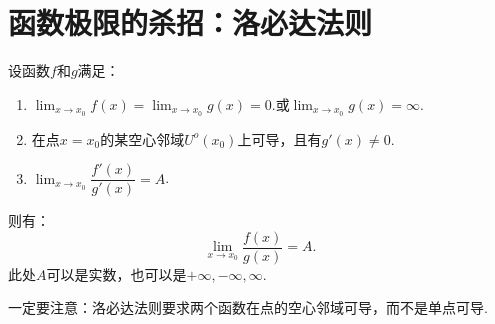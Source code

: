 \section{函数极限的杀招：洛必达法则}

\begin{theorem}[洛必达法则]
	设函数$f$和$g$满足：
	\begin{enumerate}
		\item $\displaystyle\lim_{x\to x_0}f(x)=\displaystyle\lim_{x\to x_0}g(x)=0.$或$\displaystyle\lim_{x\to x_0}g(x)=\infty$.
		\item 在点$x=x_0$的某空心邻域$U^o(x_0)$上可导，且有$g'(x)\neq 0$.
		\item $\displaystyle\lim_{x\to x_0}\dfrac{f'(x)}{g'(x)}=A$.
	\end{enumerate}
	则有：
	\begin{equation}
		\displaystyle\lim_{x\to x_0}\dfrac{f(x)}{g(x)}=A.
	\end{equation}
	此处$A$可以是实数，也可以是$+\infty,-\infty,\infty.$
\end{theorem}

一定要注意：洛必达法则要求两个函数在点的空心邻域可导，而不是单点可导.
